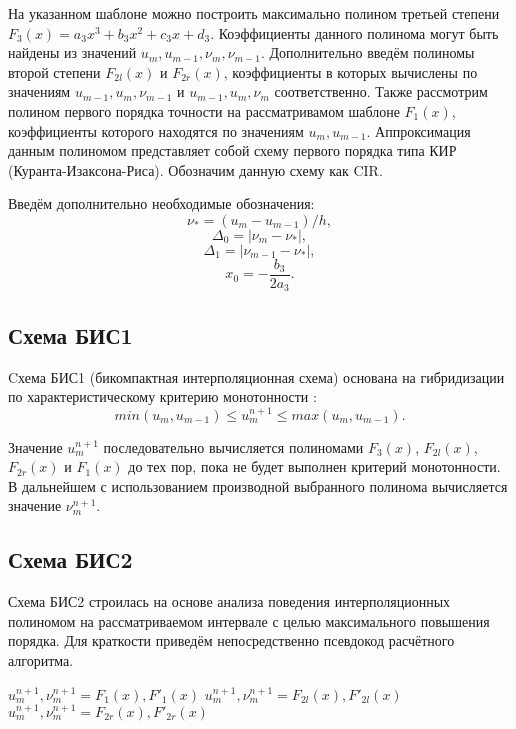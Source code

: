 \documentclass[11pt]{article}
\begin{document}
На указанном шаблоне можно построить максимально полином третьей степени $F_3(x) = a_3x^3 + b_3x^2 + c_3x + d_3$.
Коэффициенты данного полинома могут быть найдены из значений $u_m, u_{m-1}, \nu_m, \nu_{m-1}$.
Дополнительно введём полиномы второй степени $F_{2l}(x)$ и $F_{2r}(x)$, коэффициенты в которых вычислены по значениям $u_{m-1}, u_m, \nu_{m-1}$ и $u_{m-1}, u_m, \nu_m$ соответственно.
Также рассмотрим полином первого порядка точности на рассматривамом шаблоне $F_1(x)$, коэффициенты которого находятся по значениям $u_m, u_{m-1}$.
Аппроксимация данным полиномом представляет собой схему первого порядка типа КИР (Куранта-Изаксона-Риса).
Обозначим данную схему как CIR.

Введём дополнительно необходимые обозначения:
$$
\nu_* = (u_m - u_{m-1}) / h,
$$
$$
\Delta_0 = |\nu_m - \nu_*|,
$$
$$
\Delta_1 = |\nu_{m-1} - \nu_*|,
$$
$$
x_0 = -\frac{b_3}{2a_3}.
$$

\subsection{Схема БИС1}

Cхема БИС1 (бикомпактная интерполяционная схема) основана на гибридизации по характеристическому критерию монотонности \cite{Khol2006, Magometov-Kholodov-1969}:
\begin{equation}
\label{eq_cond_gc}
min(u_m, u_{m-1}) \le u^{n+1}_m \le max(u_m, u_{m-1}).
\end{equation}

Значение $u^{n+1}_m$ последовательно вычисляется полиномами $F_3(x)$, $F_{2l}(x)$, $F_{2r}(x)$ и $F_1(x)$ до тех пор, пока не будет выполнен критерий монотонности.
В дальнейшем с использованием производной выбранного полинома вычисляется значение $\nu^{n+1}_m$.

\subsection{Схема БИС2}

Схема БИС2 строилась на основе анализа поведения интерполяционных полиномом на рассматриваемом интервале с целью
максимального повышения порядка.
Для краткости приведём непосредственно псевдокод расчётного алгоритма.

\begin{algorithm}
\begin{algorithmic}[1]
\State $u_m^{n+1}, \nu_m^{n+1} = F_1(x), F'_1(x)$
\Else
{}
\State $u_m^{n+1}, \nu_m^{n+1} = F_{2l}(x), F'_{2l}(x)$
\Else
\State $u_m^{n+1}, \nu_m^{n+1} = F_{2r}(x), F'_{2r}(x)$
\EndIf
\EndIf

\end{algorithmic}
\end{algorithm}
\end{document}
